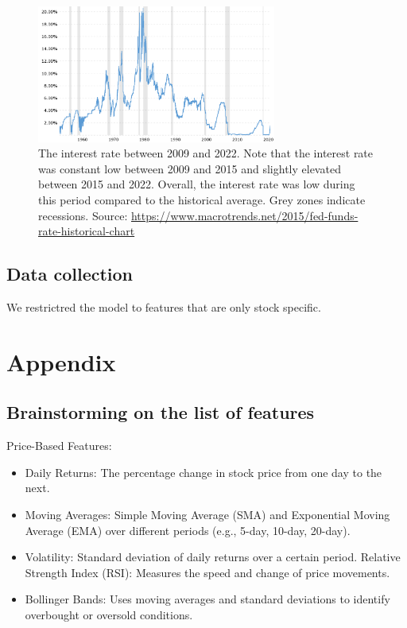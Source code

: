 \documentclass{article}
\begin{document}
\begin{figure}[h]
    \centering
    \includegraphics[width=0.7\textwidth]{IR.png}
    \caption{The interest rate between 2009 and 2022. Note that
        the interest rate was constant low between 2009 and 2015
        and slightly elevated between 2015 and 2022. Overall,
        the interest rate was low during this period compared
        to the historical average. Grey zones indicate recessions.
        Source: \url{https://www.macrotrends.net/2015/fed-funds-rate-historical-chart}}
    \label{fig:interest}
\end{figure}


\subsection*{Data collection}
We restrictred the model to features that are only stock specific.

\section*{Appendix}
\subsection*{Brainstorming on the list of features}

\small

Price-Based Features:

\begin{itemize}
    \item Daily Returns: The percentage change in stock price from one day to the next.
    \item Moving Averages: Simple Moving Average (SMA) and Exponential Moving Average (EMA) over different periods (e.g., 5-day, 10-day, 20-day).
    \item Volatility: Standard deviation of daily returns over a certain period. Relative Strength Index (RSI): Measures the speed and change of price movements.
    \item Bollinger Bands: Uses moving averages and standard deviations to identify overbought or oversold conditions.
\end{itemize}
\end{document}
